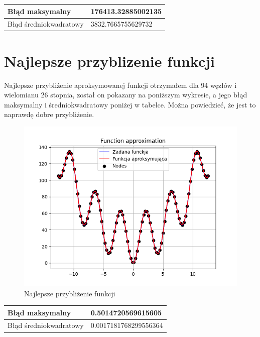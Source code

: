 \documentclass{article}
\begin{document}
\begin{table}[!ht]
    \centering
    \begin{tabular}{|l|l|}
    \hline
        Błąd maksymalny & 176413.32885002135    \\ \hline
        Błąd średniokwadratowy & 3832.7665755629732 \\ \hline
        
    \end{tabular}
\end{table}

\section{Najlepsze przyblizenie funkcji}

Najlepsze przybliżenie aproksymowanej funkcji otrzymałem dla 94 węzłów i wielomianu 26 stopnia, został on pokazany na poniższym wykresie, a jego błąd maksymalny i średniokwadratowy poniżej w tabelce. Można powiedzieć, że jest to naprawdę dobre przybliżenie.

\begin{figure}[H]
  \centering
  \begin{minipage}[b]{0.4\textwidth}
    \includegraphics[width=\textwidth]{img48.png}
    \caption{Najlepsze przybliżenie funkcji}
  \end{minipage}
\end{figure}

\begin{table}[!ht]
    \centering
    \begin{tabular}{|l|l|}
    \hline
        Błąd maksymalny & 0.5014720569615605   \\ \hline
        Błąd średniokwadratowy & 0.0017181768299556364 \\ \hline
        
    \end{tabular}
\end{table}
\end{document}

